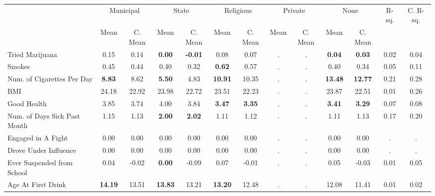 \begin{tabular}{l c c c c c c c c c c c c}
\toprule
& \multicolumn{2}{c}{Municipal} & \multicolumn{2}{c}{State} & \multicolumn{2}{c}{Religious} & \multicolumn{2}{c}{Private} & \multicolumn{2}{c}{None} & R-sq. & C. R-sq. \\
& \scriptsize Mean & \scriptsize C. Mean & \scriptsize Mean & \scriptsize C. Mean & \scriptsize Mean & \scriptsize C. Mean & \scriptsize Mean & \scriptsize C. Mean & \scriptsize Mean & \scriptsize C. Mean & & \\
\midrule
Tried Marijuana &      0.15 & 0.14 & \textbf{     0.00} & \textbf{    -0.01} &      0.08 & 0.07 &         . & . & \textbf{     0.04} & \textbf{     0.03} &      0.02 &      0.04 \\
Smokes &      0.45 & 0.44 &      0.40 & 0.32 & \textbf{     0.62} & 0.57 &         . & . &      0.40 & 0.34 &      0.05 &      0.11 \\
Num. of Cigarettes Per Day & \textbf{     8.83} & 8.62 & \textbf{     5.50} & 4.83 & \textbf{    10.91} & 10.35 &         . & . & \textbf{    13.48} & \textbf{    12.77} &      0.21 &      0.28 \\
BMI &     24.18 & 22.92 &     23.98 & 22.72 &     23.51 & 22.23 &         . & . &     23.87 & 22.51 &      0.01 &      0.26 \\
Good Health &      3.85 & 3.74 &      4.00 & 3.84 & \textbf{     3.47} & \textbf{     3.35} &         . & . & \textbf{     3.41} & \textbf{     3.29} &      0.07 &      0.08 \\
Num. of Days Sick Past Month &      1.15 & 1.13 & \textbf{     2.00} & \textbf{     2.02} &      1.11 & 1.12 &         . & . &      1.11 & 1.13 &      0.17 &      0.20 \\
Engaged in A Fight &      0.00 & 0.00 &      0.00 & 0.00 &      0.00 & 0.00 &         . & . &      0.00 & 0.00 &         . &         . \\
Drove Under Influence &      0.00 & 0.00 &      0.00 & 0.00 &      0.00 & 0.00 &         . & . &      0.00 & 0.00 &         . &         . \\
Ever Suspended from School &      0.04 & -0.02 & \textbf{     0.00} & -0.09 &      0.07 & -0.01 &         . & . &      0.05 & -0.03 &      0.01 &      0.05 \\
Age At First Drink & \textbf{    14.19} & 13.51 & \textbf{    13.83} & 13.21 & \textbf{    13.20} & 12.48 &         . & . &     12.08 & 11.41 &      0.01 &      0.02 \\
\bottomrule
\end{tabular}
